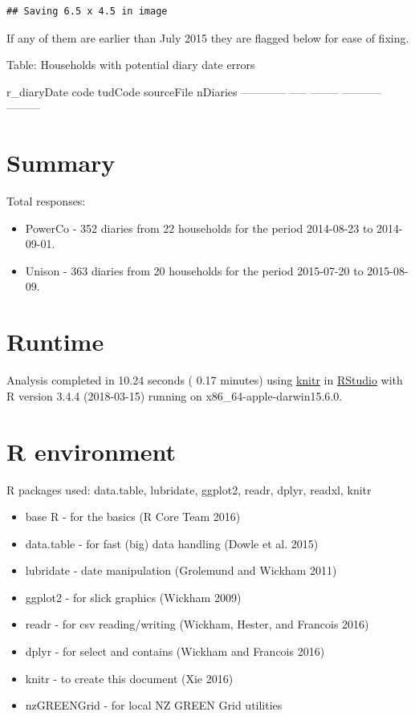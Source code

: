 \documentclass[]{article}
\providecommand{\tightlist}{%
  \setlength{\itemsep}{0pt}\setlength{\parskip}{0pt}}
\begin{document}
\begin{verbatim}
## Saving 6.5 x 4.5 in image
\end{verbatim}

If any of them are earlier than July 2015 they are flagged below for
ease of fixing.

Table: Households with potential diary date errors

r\_diaryDate code tudCode sourceFile nDiaries ------------ -----
-------- ----------- ---------

\section{Summary}\label{summary}

Total responses:

\begin{itemize}
\tightlist
\item
  PowerCo - 352 diaries from 22 households for the period 2014-08-23 to
  2014-09-01.
\item
  Unison - 363 diaries from 20 households for the period 2015-07-20 to
  2015-08-09.
\end{itemize}

\section{Runtime}\label{runtime}

Analysis completed in 10.24 seconds ( 0.17 minutes) using
\href{https://cran.r-project.org/package=knitr}{knitr} in
\href{http://www.rstudio.com}{RStudio} with R version 3.4.4 (2018-03-15)
running on x86\_64-apple-darwin15.6.0.

\section{R environment}\label{r-environment}

R packages used: data.table, lubridate, ggplot2, readr, dplyr, readxl,
knitr

\begin{itemize}
\tightlist
\item
  base R - for the basics (R Core Team 2016)
\item
  data.table - for fast (big) data handling (Dowle et al. 2015)
\item
  lubridate - date manipulation (Grolemund and Wickham 2011)
\item
  ggplot2 - for slick graphics (Wickham 2009)
\item
  readr - for csv reading/writing (Wickham, Hester, and Francois 2016)
\item
  dplyr - for select and contains (Wickham and Francois 2016)
\item
  knitr - to create this document (Xie 2016)
\item
  nzGREENGrid - for local NZ GREEN Grid utilities
\end{itemize}
\end{document}
